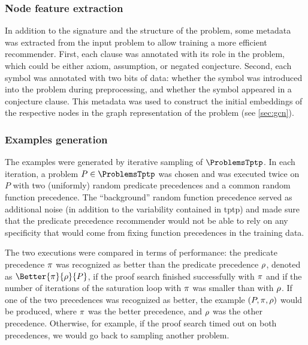 \subsubsection{Node feature extraction}

In addition to the signature and the structure of the problem,
some metadata was extracted from the input problem to allow training a more efficient recommender.
First, each clause was annotated with its role in the problem,
which could be either axiom, assumption, or negated conjecture.
Second, each symbol was annotated with two bits of data:
whether the symbol was introduced into the problem during preprocessing,
and whether the symbol appeared in a conjecture clause.
This metadata was used to construct the initial embeddings of the respective nodes
in the graph representation of the problem (see \cref{sec:gcn}).

\subsubsection{Examples generation}

The examples were generated by iterative sampling of $\ProblemsTptp$.
In each iteration, a problem $P \in \ProblemsTptp$ was chosen and \Vampire{} was executed twice on $P$
with two (uniformly) random predicate precedences and a common random function precedence.
The ``background'' random function precedence served as additional noise (in addition to the variability 
contained in \acrshort{tptp}) and made sure that the predicate precedence recommender
would not be able to rely on any specificity that would come from fixing function precedences in the training data.

The two executions were compared in terms of performance:
the predicate precedence $\pi$ was recognized as better than the predicate precedence $\rho$,
denoted as $\Better{\PrecBetter}{\PrecWorse}{P}$,
if the proof search finished successfully with $\pi$
and if the number of iterations of the saturation loop with $\pi$ was smaller than with $\rho$.
If one of the two precedences was recognized as better,
the example $(P, \pi, \rho)$ would be produced,
where $\pi$ was the better precedence,
and $\rho$ was the other precedence.
Otherwise, for example, if the proof search timed out on both precedences, we would go back to sampling another problem.

